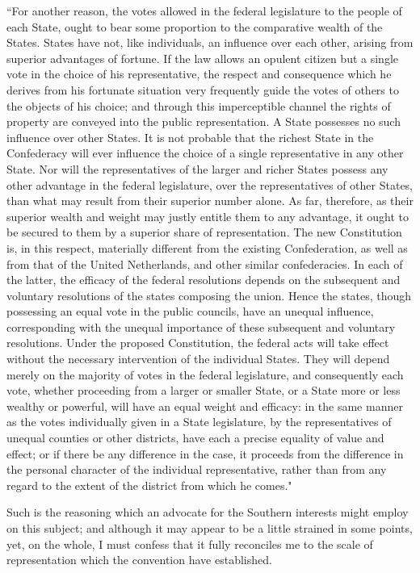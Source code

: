 ``For another reason, the votes allowed in the federal legislature to the people of each State, ought to bear some proportion to the comparative wealth of the States. States have not, like individuals, an influence over each other, arising from superior advantages of fortune. If the law allows an opulent citizen but a single vote in the choice of his representative, the respect and consequence which he derives from his fortunate situation very frequently guide the votes of others to the objects of his choice; and through this imperceptible channel the rights of property are conveyed into the public representation. A State possesses no such influence over other States. It is not probable that the richest State in the Confederacy will ever influence the choice of a single representative in any other State. Nor will the representatives of the larger and richer States possess any other advantage in the federal legislature, over the representatives of other States, than what may result from their superior number alone. As far, therefore, as their superior wealth and weight may justly entitle them to any advantage, it ought to be secured to them by a superior share of representation. The new Constitution is, in this respect, materially different from the existing Confederation, as well as from that of the United Netherlands, and other similar confederacies. In each of the latter, the efficacy of the federal resolutions depends on the subsequent and voluntary resolutions of the states composing the union. Hence the states, though possessing an equal vote in the public councils, have an unequal influence, corresponding with the unequal importance of these subsequent and voluntary resolutions. Under the proposed Constitution, the federal acts will take effect without the necessary intervention of the individual States. They will depend merely on the majority of votes in the federal legislature, and consequently each vote, whether proceeding from a larger or smaller State, or a State more or less wealthy or powerful, will have an equal weight and efficacy: in the same manner as the votes individually given in a State legislature, by the representatives of unequal counties or other districts, have each a precise equality of value and effect; or if there be any difference in the case, it proceeds from the difference in the personal character of the individual representative, rather than from any regard to the extent of the district from which he comes."

Such is the reasoning which an advocate for the Southern interests might employ on this subject; and although it may appear to be a little strained in some points, yet, on the whole, I must confess that it fully reconciles me to the scale of representation which the convention have established.

